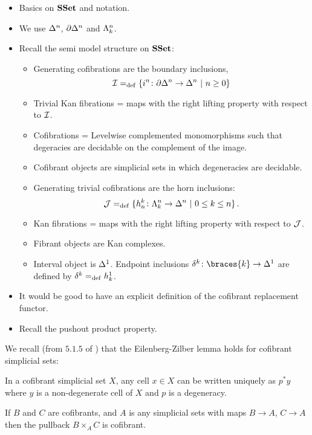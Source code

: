 \documentclass[reqno,10pt,a4paper,oneside,draft]{amsart}
\begin{document}
\begin{itemize}
\item Basics on $\SSet$ and notation. 
\item We use $\Delt{n}$, $\partial \Delt{n}$ and $\Horn{k}{n}$.
\item Recall the semi model structure on $\SSet$:
\begin{itemize}
\item Generating cofibrations are the boundary inclusions, 
\[
\cal{I} \defeq \{ \inc{n} \co  \partial \Delt{n} \to \Delt{n} \ | \ n \geq 0 \}
\]
\item Trivial Kan fibrations = maps with the right lifting property with respect to $\cal{I}$.
\item Cofibrations = Levelwise complemented monomorphisms such that degeracies are decidable on the complement of the image. 
\item Cofibrant objects are simplicial sets in which degeneracies are decidable.
\item Generating trivial cofibrations are the horn inclusions:
\[
\cal{J} \defeq \{ \horninc{k}{n}  \co \Horn{k}{n} \to \Delt{n} \ | \ 0 \leq k \leq n \} \, .
\]
\item Kan fibrations = maps with the right lifting property with respect to $\cal{J}$.
\item Fibrant objects are Kan complexes.
\item Interval object is $\Delt{1}$. Endpoint inclusions $\kcyl \co \braces{ k} \to \Delt{1}$ are
defined by $\kcyl \defeq \horninc{1}{k}$.
\end{itemize}
\item It would be good to have an explicit definition of the cofibrant replacement functor.
\item Recall the pushout product property.
\end{itemize}

 


We recall (from $5.1.5$ of \cite{henry2018wms}) that the Eilenberg-Zilber lemma holds for cofibrant simplicial sets:

\begin{lemma}
\label{lem:EZ_cof}In a cofibrant simplicial set $X$, any cell $x \in X$ can be written uniquely as $p^* y$ where $y$ is a non-degenerate cell of $X$ and $p$ is a degeneracy.
\end{lemma}




\begin{lemma}\label{lem:cofibrant_fiber_product}
If $B$ and $C$ are cofibrants, and $A$ is any simplicial sets with maps $B \rightarrow A$, $C \rightarrow A$ then the pullback $B \times_{A} C$ is cofibrant.
\end{lemma}
\end{document}
